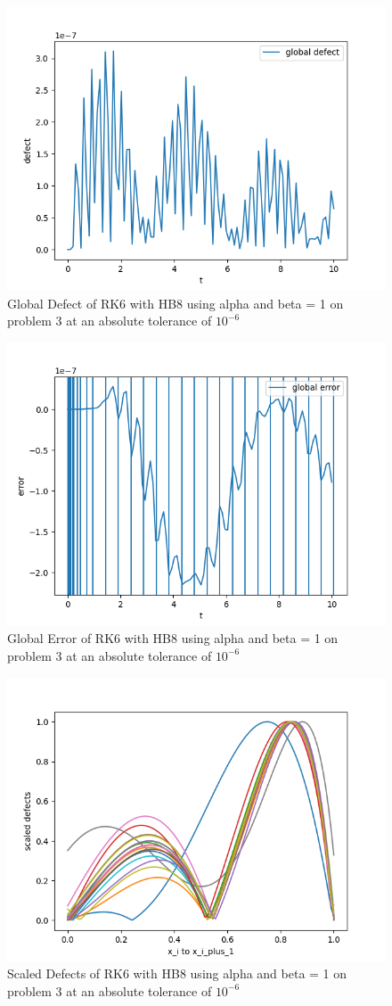 \documentclass{article}
\begin{document}
\begin{figure}[H]
\centering
\includegraphics[width=0.7\linewidth]{./figures/static_alpha_rk4_with_hb6_p3_global_defect}
\caption{Global Defect of RK6 with HB8 using alpha and beta = 1 on problem 3 at an absolute tolerance of $10^{-6}$}
\label{fig:static_alpha_rk6_with_hb8_p3_global_defect}
\end{figure}

\begin{figure}[H]
\centering
\includegraphics[width=0.7\linewidth]{./figures/static_alpha_rk6_with_hb8_p3_global_error}
\caption{Global Error of RK6 with HB8 using alpha and beta = 1 on problem 3 at an absolute tolerance of $10^{-6}$}
\label{fig:static_alpha_rk6_with_hb8_p3_global_error}
\end{figure}

\begin{figure}[H]
\centering
\includegraphics[width=0.7\linewidth]{./figures/static_alpha_rk6_with_hb8_p3_scaled_defects}
\caption{Scaled Defects of RK6 with HB8 using alpha and beta = 1 on problem 3 at an absolute tolerance of $10^{-6}$}
\label{fig:static_alpha_rk6_with_hb8_p3_scaled_defects}
\end{figure}
\end{document}
